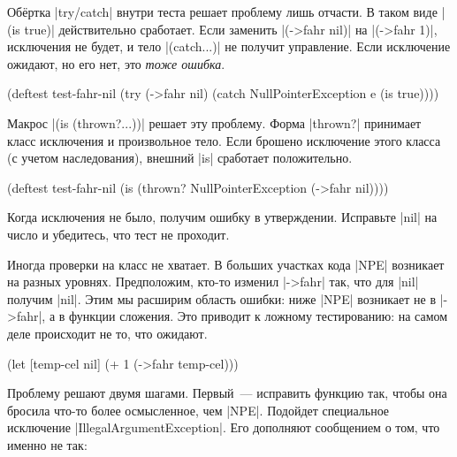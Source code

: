 Об\"{е}ртка \spverb|try/catch| внутри теста решает проблему лишь отчасти. В
таком виде \spverb|(is true)| действительно сработает. Если заменить
\spverb|(->fahr nil)| на \spverb|(->fahr 1)|, исключения не будет, и тело
\spverb|(catch...)| не получит управление. Если исключение ожидают, но его нет,
это \emph{тоже ошибка}.


\begin{english}
  \begin{clojure}
(deftest test-fahr-nil
  (try
    (->fahr nil)
    (catch NullPointerException e
      (is true))))
  \end{clojure}
\end{english}

Макрос \spverb|(is (thrown?...))| решает эту проблему. Форма \spverb|thrown?|
принимает класс исключения и произвольное тело. Если брошено исключение этого
класса (с учетом наследования), внешний \spverb|is| сработает
положительно.

\begin{english}
  \begin{clojure}
(deftest test-fahr-nil
  (is (thrown? NullPointerException
               (->fahr nil))))
  \end{clojure}
\end{english}

Когда исключения не было, получим ошибку в утверждении. Исправьте \spverb|nil|
на число и убедитесь, что тест не проходит.


Иногда проверки на класс не хватает. В больших участках кода \spverb|NPE|
возникает на разных уровнях. Предположим, кто-то изменил \spverb|->fahr| так,
что для \spverb|nil| получим \spverb|nil|. Этим мы расширим область ошибки: ниже
\spverb|NPE| возникает не в \spverb|->fahr|, а в функции сложения. Это приводит
к ложному тестированию: на самом деле происходит не то, что ожидают.

\begin{english}
  \begin{clojure}
(let [temp-cel nil]
  (+ 1 (->fahr temp-cel)))
  \end{clojure}
\end{english}

Проблему решают двумя шагами. Первый~--- исправить функцию так, чтобы она
бросила что-то более осмысленное, чем \spverb|NPE|. Подойдет специальное
исключение \spverb|IllegalArgumentException|. Его дополняют сообщением о том,
что именно не так:

